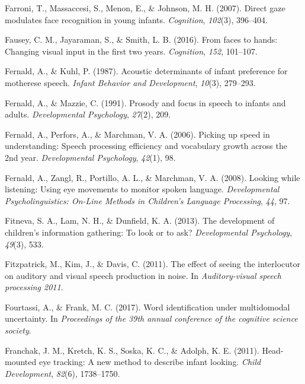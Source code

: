 \documentclass[oneside]{report}
\begin{document}
\hypertarget{ref-farroni2007direct}{}
Farroni, T., Massaccesi, S., Menon, E., \& Johnson, M. H. (2007). Direct
gaze modulates face recognition in young infants. \emph{Cognition},
\emph{102}(3), 396--404.

\hypertarget{ref-fausey2016faces}{}
Fausey, C. M., Jayaraman, S., \& Smith, L. B. (2016). From faces to
hands: Changing visual input in the first two years. \emph{Cognition},
\emph{152}, 101--107.

\hypertarget{ref-fernald1987acoustic}{}
Fernald, A., \& Kuhl, P. (1987). Acoustic determinants of infant
preference for motherese speech. \emph{Infant Behavior and Development},
\emph{10}(3), 279--293.

\hypertarget{ref-fernald1991prosody}{}
Fernald, A., \& Mazzie, C. (1991). Prosody and focus in speech to
infants and adults. \emph{Developmental Psychology}, \emph{27}(2), 209.

\hypertarget{ref-fernald2006picking}{}
Fernald, A., Perfors, A., \& Marchman, V. A. (2006). Picking up speed in
understanding: Speech processing efficiency and vocabulary growth across
the 2nd year. \emph{Developmental Psychology}, \emph{42}(1), 98.

\hypertarget{ref-fernald2008looking}{}
Fernald, A., Zangl, R., Portillo, A. L., \& Marchman, V. A. (2008).
Looking while listening: Using eye movements to monitor spoken language.
\emph{Developmental Psycholinguistics: On-Line Methods in Children's
Language Processing}, \emph{44}, 97.

\hypertarget{ref-fitneva2013development}{}
Fitneva, S. A., Lam, N. H., \& Dunfield, K. A. (2013). The development
of children's information gathering: To look or to ask?
\emph{Developmental Psychology}, \emph{49}(3), 533.

\hypertarget{ref-fitzpatrick2011effect}{}
Fitzpatrick, M., Kim, J., \& Davis, C. (2011). The effect of seeing the
interlocutor on auditory and visual speech production in noise. In
\emph{Auditory-visual speech processing 2011}.

\hypertarget{ref-fourtassiword2018}{}
Fourtassi, A., \& Frank, M. C. (2017). Word identification under
multidomodal uncertainty. In \emph{Proceedings of the 39th annual
conference of the cognitive science society}.

\hypertarget{ref-franchak2011head}{}
Franchak, J. M., Kretch, K. S., Soska, K. C., \& Adolph, K. E. (2011).
Head-mounted eye tracking: A new method to describe infant looking.
\emph{Child Development}, \emph{82}(6), 1738--1750.
\end{document}
